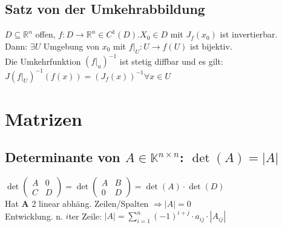 \documentclass[6pt,a4paper]{scrartcl}
\newcommand{\ma}[1]{\ensuremath{\boldsymbol {#1}}}												%
\newcommand{\ra}[0]{\ensuremath{\rightarrow}} 									%
\newcommand{\C}{\ensuremath{\mathbb C}}
\begin{document}
\begin{multicols*}{4}
\subsection{Satz von der Umkehrabbildung}

$D \subseteq \mathbb R^n$ offen, $f: D \ra \mathbb R^n \in C^1 (D). X_0 \in D$ mit $J_f (x_0)$ ist invertierbar. \\
Dann: $\exists U$ Umgebung von $x_0$ mit $f |_U : U \ra f(U)$ ist bijektiv. \\
Die Umkehrfunktion $(f|_u)^{-1}$ ist stetig diffbar und es gilt: \\
$J(f|_U)^{-1} (f(x)) = (J_f (x))^{-1} \forall x \in U$

\section{Matrizen}

\subsection{Determinante von $A\in \mathbb K^{n\times n}$: $\det(A)=|A|$}

$\det\begin{pmatrix}A&0\\C&D\end{pmatrix}=\det\begin{pmatrix}A&B\\0&D\end{pmatrix}=\det(A)\cdot\det(D)$ \\
Hat $\ma A$ 2 linear abhäng. Zeilen/Spalten $\Rightarrow |A|=0$ \\
Entwicklung. n. $i$ter Zeile: $|A|=\sum\limits_{i=1}^n (-1)^{i+j} \cdot a_{ij} \cdot |A_{ij}|$ \qquad 



\end{multicols*}
\end{document}

